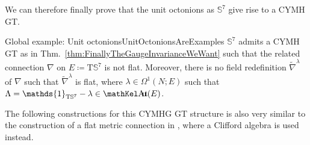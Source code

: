 We can therefore finally prove that the unit octonions as $\mathds{S}^7$ give rise to a CYMH GT.

\begin{theorems}{Global example: Unit octonions}{UnitOctonionsAreExamples}
$\mathds{S}^7$ admits a CYMH GT as in Thm.~\ref{thm:FinallyTheGaugeInvarianceWeWant} such that the related connection $\nabla$ on $E \coloneqq \mathrm{T}\mathds{S}^7$ is not flat. Moreover, there is no field redefinition $\widetilde{\nabla}^\lambda$ of $\nabla$ such that $\widetilde{\nabla}^\lambda$ is flat, where $\lambda \in \Omega^1(N;E)$ such that $\Lambda = \mathds{1}_{\mathrm{T}\mathbb{S}^7} - \lambda \in \sAut(E)$.
\end{theorems}

\begin{remark}
\leavevmode\newline
The following constructions for this CYMHG GT structure is also very similar to the construction of a flat metric connection in \cite[\S 4]{flatmetricconn}, where a Clifford algebra is used instead.
\end{remark}

